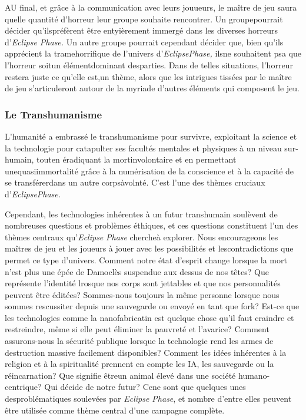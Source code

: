 AU final, et grâce à la communication avec leurs jouueurs, le maître de jeu saura quelle quantité d'horreur leur groupe souhaite rencontrer. Un groupepourrait décider qu'ilspréfèrent être entyièrement immergé dans les diverses horreurs d'\textit{Eclipse Phase.} Un autre groupe pourrait cependant décider que, bien qu'ils apprécient la tramehorrifique de l'univers d'\textit{EclipsePhase,} ilsne souhaitent psa que l'horreur soitun élémentdominant desparties. Dans de telles situations, l'horreur restera juste ce qu'elle est,un thème, alors que les intrigues tissées par le maître de jeu s'articuleront autour de la myriade d'autres éléments qui composent le jeu. 

\subsubsection{Le Transhumanisme} 

L'humanité a embrassé le transhumanisme pour survivre, exploitant la science et la technologie pour catapulter ses facultés mentales et physiques à un niveau sur-humain, touten éradiquant la mortinvolontaire et en permettant unequasiimmortalité grâce à la numérisation de la conscience et à la capacité de se transférerdans un autre corpsàvolnté. C'est l'une des thèmes cruciaux d'\textit{EclipsePhase.} 

Cependant, les technologies inhérentes à un futur transhumain soulèvent de nombreuses questions et problèmes éthiques, et ces questions constituent l'un des thèmes centraux qu'\textit{Eclipse }\textit{Phase} chercheà explorer. Nous encourageons les maîtres de jeu et les joueurs à jouer avec les possibilités et lescontradictions que permet ce type d'univers. Comment notre état d'esprit change lorsque la mort n'est plus une épée de Damoclès suspendue aux dessus de nos têtes? Que représente l'identité lrosque nos corps sont jettables et que nos personnalités peuvent être éditées? Sommes-nous toujours la même personne lorsque nous sommes rescussiter depuis une sauvegarde ou envoyé en tant que fork? Est-ce que les technologies comme la nanofabricatin est quelque chose qu'il faut craindre et restreindre, même si elle peut éliminer la pauvreté et l'avarice? Comment assurons-nous la sécurité publique lorsque la technologie rend les armes de destruction massive facilement disponibles? Comment les idées inhérentes à la religion et à la spiritualité prennent en compte les IA, les sauvegarde ou la réincarnation? Que signifie êtreun animal élevé dans une société humano-centrique? Qui décide de notre futur? Cene sont que quelques unes desproblématiques soulevées par \textit{Eclipse Phase}, et nombre d'entre elles peuvent être utilisée comme thème central d'une campagne complète. 
